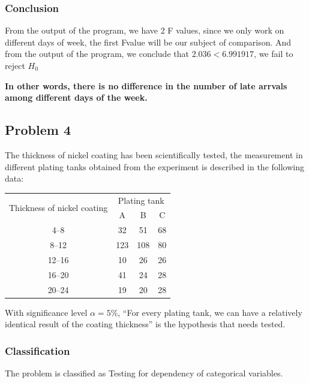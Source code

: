 \documentclass[a4paper]{article}
\numberwithin{equation}{section}
\begin{document}
\subsubsection{Conclusion}
From the output of the program, we have 2 F values, since we only work on different days of week, the first Fvalue will be our subject of comparison. And from the output of the program, we conclude that \(2.036 < 6.991917\), we fail to reject \(H_0\)

\textbf{In other words, there is no difference in the number of late arrvals among different days of the week.}

\newpage
\subsection{Problem 4}
The thickness of nickel coating has been scientifically tested, the measurement in different plating tanks obtained from the experiment is described in the following data:
\begin{center}
  \begin{tabular}{cccc}
    \toprule
    \multirow{2}{*}{Thickness of nickel coating} & \multicolumn{3}{c}{Plating tank}            \\
    \cmidrule(lr){2-4}
                                                 & A                                & B   & C  \\
    \midrule
    4--8                                         & 32                               & 51  & 68 \\
    8--12                                        & 123                              & 108 & 80 \\
    12--16                                       & 10                               & 26  & 26 \\
    16--20                                       & 41                               & 24  & 28 \\
    20--24                                       & 19                               & 20  & 28 \\
    \bottomrule
  \end{tabular}
\end{center}

With significance level \( \alpha = 5\% \), ``For every plating tank, we can have a relatively identical result of the coating thickness'' is the hypothesis that needs tested.

\subsubsection{Classification}
The problem is classified as Testing for dependency of categorical variables.
\end{document}
